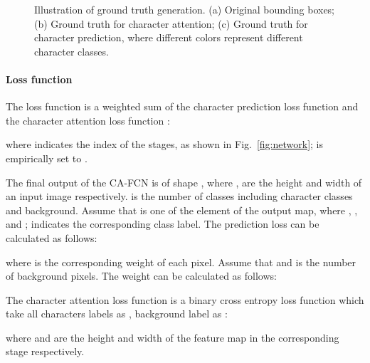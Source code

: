 \documentclass[letterpaper]{article} \usepackage{aaai19}  \usepackage{times}  \usepackage{helvet}  \usepackage{courier}  \usepackage{url}  \usepackage{graphicx}  \frenchspacing  \usepackage{multirow}
\begin{document}
\begin{figure}[!hbp]
\begin{center}
\captionsetup[subfigure]{justification=centering}
    \centering
{}
\end{center}
\caption{Illustration of ground truth generation. (a) Original bounding boxes; (b) Ground truth for character attention; (c) Ground truth for character prediction, where different colors represent different character classes.}
\label{fig:labels}
\end{figure}

\paragraph{Loss function}
The loss function is a weighted sum of the character prediction loss function  and the character attention loss function :

where  indicates the index of the stages, as shown in Fig.~\ref{fig:network};  is empirically set to .

The final output of the CA-FCN is of shape , where ,  are the height and width of an input image respectively.  is the number of classes including character classes and background. Assume that  is one of the element of the output map, where , , and ;  indicates the corresponding class label. The prediction loss can be calculated as follows:

where  is the corresponding weight of each pixel. Assume that  and  is the number of background pixels. The weight can be calculated as follows:

The character attention loss function is a binary cross entropy loss function which take all characters labels as , background label as :

where  and  are the height and width of the feature map in the corresponding stage  respectively.
\end{document}
